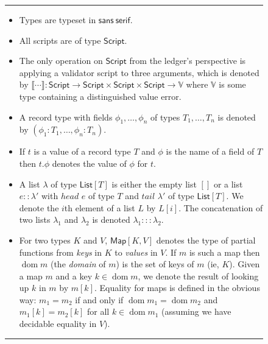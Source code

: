 \documentclass[a4paper]{article}
\newcommand{\s}{\textsf}  %
\theoremstyle{definition}  %
\newcommand\rfskip{7pt}
\newenvironment{ruledfigure}[1]{\begin{figure}[#1]\hrule\vspace{\rfskip}}{\vspace{\rfskip}\hrule\end{figure}}
\newcommand{\List}[1]{\ensuremath{\s{List}[#1]}}
\newcommand{\Map}[2]{\ensuremath{\s{Map}[#1,#2]}}
\newcommand{\dom}{\ensuremath{\mathop{\mathrm{dom}}}}
\begin{document}
\begin{ruledfigure}{H}
  \begin{itemize}
\item Types are typeset in $\mathsf{sans~serif}$.

\item All scripts are of type $\mathsf{Script}$.

\item The only operation on $\mathsf{Script}$ from the ledger's
  perspective is applying a validator script to three arguments,
  which is denoted by $\llbracket \cdots \rrbracket :
  \mathsf{Script} \rightarrow \mathsf{Script} \times \mathsf{Script}
    \times \mathsf{Script} \rightarrow \mathbb{V}$ where $\mathbb{V}$
    is some type containing a distinguished value
    \textsf{error}\footnotemark.

\item A record type with fields $\phi_1, \ldots, \phi_n$ of types $T_1,
  \ldots, T_n$ is denoted by $(\phi_1 : T_1, \ldots, \phi_n : T_n)$.

\item If $t$ is a value of a record type $T$ and $\phi$ is the name
  of a field of $T$ then $t.\phi$ denotes the value of $\phi$ for
  $t$.
  
\item A list $\lambda$ of type $\List{T}$ is
    either the empty list $[]$ or a list $e :: \lambda'$ with $head$
    $e$ of type $T$ and $tail$ $\lambda'$ of type
    $\List{T}$. We denote the $i$th element of a list
    $L$ by $L[i]$.
    The concatenation of two lists $\lambda_1$ and
    $\lambda_2$ is denoted $\lambda_1 ::: \lambda_2$.

  \item For two types $K$ and $V$, $\Map{K}{V}$ denotes the type of
    partial functions from \textit{keys} in $K$ to \textit{values} in
    $V$.  If $m$ is such a map then $\dom m$ (the \textit{domain} of
    $m$) is the set of keys of $m$ (ie, $K$).  Given a map $m$ and a
    key $k \in \dom m$, we denote the result of looking up $k$ in $m$
    by $m[k]$.  Equality for maps is defined in the obvious way: $m_1
    = m_2$ if and only if $\dom m_1 = \dom m_2$ and $m_1[k] = m_2[k]$
    for all $k \in \dom m_1$ (assuming we have decidable equality in $V$).
    

\end{itemize}
\end{ruledfigure}
\end{document}
